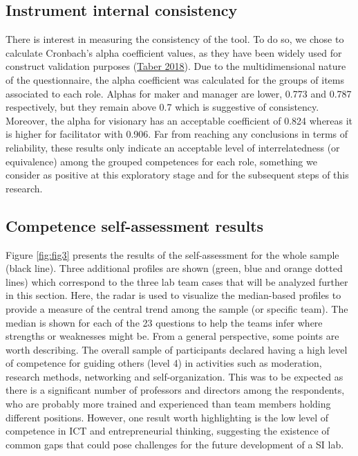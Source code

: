 \documentclass[AMA,STIX1COL,APA,STIX2COL]{WileyNJD-v2}
\begin{document}
\hypertarget{instrument-internal-consistency}{%
\subsection{Instrument internal
consistency}\label{instrument-internal-consistency}}

There is interest in measuring the consistency of the tool. To do so, we
chose to calculate Cronbach's alpha coefficient values, as they have
been widely used for construct validation purposes
(\protect\hyperlink{ref-Taber2018}{Taber 2018}). Due to the
multidimensional nature of the questionnaire, the alpha coefficient was
calculated for the groups of items associated to each role. Alphas for
maker and manager are lower, 0.773 and 0.787 respectively, but they
remain above 0.7 which is suggestive of consistency. Moreover, the alpha
for visionary has an acceptable coefficient of 0.824 whereas it is
higher for facilitator with 0.906. Far from reaching any conclusions in
terms of reliability, these results only indicate an acceptable level of
interrelatedness (or equivalence) among the grouped competences for each
role, something we consider as positive at this exploratory stage and
for the subsequent steps of this research.

\hypertarget{competence-self-assessment-results}{%
\subsection{Competence self-assessment
results}\label{competence-self-assessment-results}}

Figure \ref{fig:fig3} presents the results of the self-assessment for
the whole sample (black line). Three additional profiles are shown
(green, blue and orange dotted lines) which correspond to the three lab
team cases that will be analyzed further in this section. Here, the
radar is used to visualize the median-based profiles to provide a
measure of the central trend among the sample (or specific team). The
median is shown for each of the 23 questions to help the teams infer
where strengths or weaknesses might be. From a general perspective, some
points are worth describing. The overall sample of participants declared
having a high level of competence for guiding others (level 4) in
activities such as moderation, research methods, networking and
self-organization. This was to be expected as there is a significant
number of professors and directors among the respondents, who are
probably more trained and experienced than team members holding
different positions. However, one result worth highlighting is the low
level of competence in ICT and entrepreneurial thinking, suggesting the
existence of common gaps that could pose challenges for the future
development of a SI lab.
\end{document}
